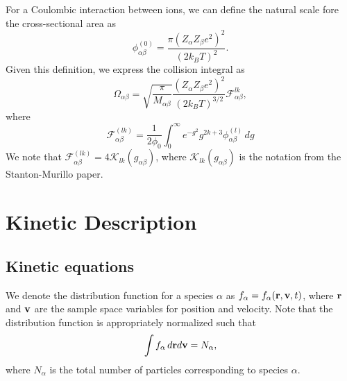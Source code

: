 \documentclass[a4paper,11pt]{report}
\begin{document}
For a Coulombic interaction between ions, we can define the natural scale fore the cross-sectional area as
\begin{equation}
    \phi^{(0)}_{\alpha \beta} = \frac{ \pi \left (Z_\alpha Z_\beta e^2 \right)^2}{ \left(2 k_B T\right)^2}.
\end{equation}
Given this definition, we express the collision integral as
\begin{equation}
    \Omega_{\alpha \beta} = \sqrt{ \frac{\pi }{M_{\alpha \beta}}} \frac{( Z_\alpha Z_\beta e^2)^2 }{(2 k_B T )^{3/2}} \mathcal{F}^{lk}_{\alpha \beta},
\end{equation}
where
\begin{equation}
    \mathcal{F}^{(lk)}_{\alpha \beta} = \frac{1}{2 \phi_0} \int_0^\infty e^{-g^2} g^{2k+3} \phi_{\alpha \beta}^{(l)} \, dg
\end{equation}
We note that $\mathcal{F}^{(lk)}_{\alpha \beta} = 4 \mathcal{K}_{lk}(g_{\alpha \beta})$, where $\mathcal{K}_{lk}(g_{\alpha \beta})$ is the notation from the Stanton-Murillo paper.

\part{Kinetic Description}                                                  %

\chapter{Kinetic equations}
We denote the distribution function for a species $\alpha$ as $f_\alpha = f_\alpha(\mathbf{r}, \mathbf{v}, t)$, where $\mathbf{r}$ and $\mathbf{v}$ are the sample space variables for position and velocity. Note that the distribution function is appropriately normalized such that
\begin{equation}
\int f_\alpha \, d\mathbf{r} d\mathbf{v} = N_\alpha,
\end{equation}
where $N_\alpha$ is the total number of particles corresponding to species $\alpha$. 
\end{document}
